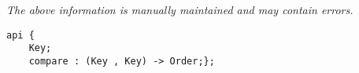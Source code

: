 \label{api:Key}

{\tiny \it The above information is manually maintained and may contain errors.}
\begin{verbatim}
api {
    Key;
    compare : (Key , Key) -> Order;};
\end{verbatim}
